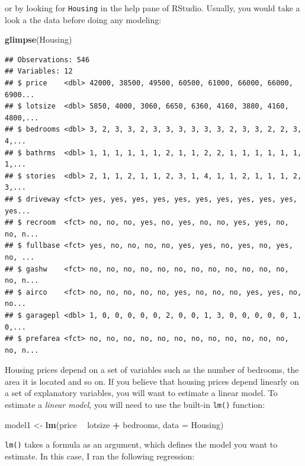 \documentclass[]{gitbook}
\newenvironment{Shaded}{\begin{snugshade}}{\end{snugshade}}
\newcommand{\DataTypeTok}[1]{\textcolor[rgb]{0.13,0.29,0.53}{#1}}
\newcommand{\KeywordTok}[1]{\textcolor[rgb]{0.13,0.29,0.53}{\textbf{#1}}}
\newcommand{\NormalTok}[1]{#1}
\newcommand{\OperatorTok}[1]{\textcolor[rgb]{0.81,0.36,0.00}{\textbf{#1}}}
\newcommand{\StringTok}[1]{\textcolor[rgb]{0.31,0.60,0.02}{#1}}
\theoremstyle{definition}
\theoremstyle{definition}
\theoremstyle{definition}
\theoremstyle{remark}
\begin{document}
or by looking for \texttt{Housing} in the help pane of RStudio. Usually,
you would take a look a the data before doing any modeling:

\begin{Shaded}
\begin{Highlighting}[]
\KeywordTok{glimpse}\NormalTok{(Housing)}
\end{Highlighting}
\end{Shaded}

\begin{verbatim}
## Observations: 546
## Variables: 12
## $ price    <dbl> 42000, 38500, 49500, 60500, 61000, 66000, 66000, 6900...
## $ lotsize  <dbl> 5850, 4000, 3060, 6650, 6360, 4160, 3880, 4160, 4800,...
## $ bedrooms <dbl> 3, 2, 3, 3, 2, 3, 3, 3, 3, 3, 3, 2, 3, 3, 2, 2, 3, 4,...
## $ bathrms  <dbl> 1, 1, 1, 1, 1, 1, 2, 1, 1, 2, 2, 1, 1, 1, 1, 1, 1, 1,...
## $ stories  <dbl> 2, 1, 1, 2, 1, 1, 2, 3, 1, 4, 1, 1, 2, 1, 1, 1, 2, 3,...
## $ driveway <fct> yes, yes, yes, yes, yes, yes, yes, yes, yes, yes, yes...
## $ recroom  <fct> no, no, no, yes, no, yes, no, no, yes, yes, no, no, n...
## $ fullbase <fct> yes, no, no, no, no, yes, yes, no, yes, no, yes, no, ...
## $ gashw    <fct> no, no, no, no, no, no, no, no, no, no, no, no, no, n...
## $ airco    <fct> no, no, no, no, no, yes, no, no, no, yes, yes, no, no...
## $ garagepl <dbl> 1, 0, 0, 0, 0, 0, 2, 0, 0, 1, 3, 0, 0, 0, 0, 0, 1, 0,...
## $ prefarea <fct> no, no, no, no, no, no, no, no, no, no, no, no, no, n...
\end{verbatim}

Housing prices depend on a set of variables such as the number of
bedrooms, the area it is located and so on. If you believe that housing
prices depend linearly on a set of explanatory variables, you will want
to estimate a linear model. To estimate a \emph{linear model}, you will
need to use the built-in \texttt{lm()} function:

\begin{Shaded}
\begin{Highlighting}[]
\NormalTok{model1 <-}\StringTok{ }\KeywordTok{lm}\NormalTok{(price }\OperatorTok{~}\StringTok{ }\NormalTok{lotsize }\OperatorTok{+}\StringTok{ }\NormalTok{bedrooms, }\DataTypeTok{data =}\NormalTok{ Housing)}
\end{Highlighting}
\end{Shaded}

\texttt{lm()} takes a formula as an argument, which defines the model
you want to estimate. In this case, I ran the following regression:
\end{document}
